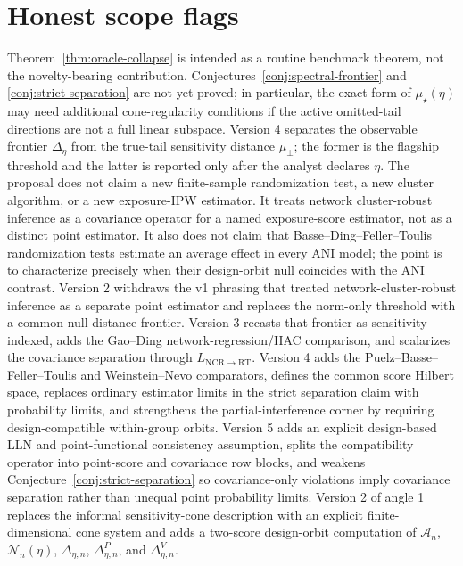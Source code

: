\documentclass[11pt]{article}
\theoremstyle{definition}
\theoremstyle{plain}
\theoremstyle{remark}
\begin{document}
\section{Honest scope flags}
Theorem~\ref{thm:oracle-collapse} is intended as a routine benchmark theorem,
not the novelty-bearing contribution.  Conjectures~\ref{conj:spectral-frontier}
and \ref{conj:strict-separation} are not yet proved; in particular, the exact
form of \(\mu_\star(\eta)\) may need additional cone-regularity conditions if
the active omitted-tail directions are not a full linear subspace.  Version 4
separates the observable frontier \(\Delta_\eta\) from the true-tail
sensitivity distance \(\mu_{\perp}\); the former is the flagship threshold and
the latter is reported only after the analyst declares \(\eta\).  The proposal
does not claim a new finite-sample
randomization test, a new cluster algorithm, or a new exposure-IPW estimator.
It treats network cluster-robust inference as a covariance operator for a named
exposure-score estimator, not as a distinct point estimator.  It also does not
claim that Basse--Ding--Feller--Toulis randomization tests estimate an average
effect in every ANI model; the point is to characterize precisely when their
design-orbit null coincides with the ANI contrast.  Version 2 withdraws the v1
phrasing that treated network-cluster-robust inference as a separate point
estimator and replaces the norm-only threshold with a common-null-distance
frontier.  Version 3 recasts that frontier as sensitivity-indexed, adds the
Gao--Ding network-regression/HAC comparison, and scalarizes the covariance
separation through \(L_{\mathrm{NCR}\to\mathrm{RT}}\).  Version 4 adds the
Puelz--Basse--Feller--Toulis and Weinstein--Nevo comparators, defines the
common score Hilbert space, replaces ordinary estimator limits in the strict
separation claim with probability limits, and strengthens the
partial-interference corner by requiring design-compatible within-group
orbits.  Version 5 adds an explicit design-based LLN and point-functional
consistency assumption, splits the compatibility operator into point-score and
covariance row blocks, and weakens Conjecture~\ref{conj:strict-separation} so
covariance-only violations imply covariance separation rather than unequal
point probability limits.  Version 2 of angle 1 replaces the informal
sensitivity-cone description with an explicit finite-dimensional cone system
and adds a two-score design-orbit computation of \(\mathcal A_n\),
\(\mathcal N_n(\eta)\), \(\Delta_{\eta,n}\), \(\Delta^P_{\eta,n}\), and
\(\Delta^V_{\eta,n}\).
\end{document}
